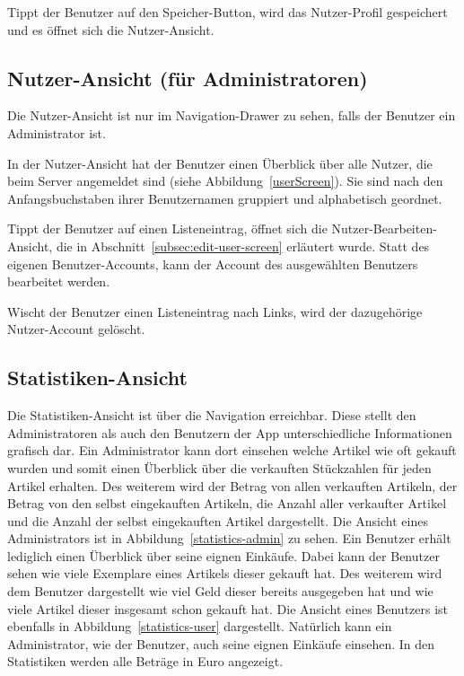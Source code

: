Tippt der Benutzer auf den Speicher-Button, wird das Nutzer-Profil gespeichert und es öffnet sich die Nutzer-Ansicht.

\subsection{Nutzer-Ansicht (für Administratoren)} \label{subsec:user-screen}

Die Nutzer-Ansicht ist nur im Navigation-Drawer zu sehen, falls der Benutzer ein Administrator ist.

In der Nutzer-Ansicht hat der Benutzer einen Überblick über alle Nutzer, die beim Server angemeldet sind (siehe Abbildung~\ref{userScreen}).
Sie sind nach den Anfangsbuchstaben ihrer Benutzernamen gruppiert und alphabetisch geordnet.

Tippt der Benutzer auf einen Listeneintrag, öffnet sich die Nutzer-Bearbeiten-Ansicht, die in Abschnitt~\ref{subsec:edit-user-screen} erläutert wurde.
Statt des eigenen Benutzer-Accounts, kann der Account des ausgewählten Benutzers bearbeitet werden.

Wischt der Benutzer einen Listeneintrag nach Links, wird der dazugehörige Nutzer-Account gelöscht.

\subsection{Statistiken-Ansicht} \label{subsec:statistics-screen}

Die Statistiken-Ansicht ist über die Navigation erreichbar.
Diese stellt den Administratoren als auch den Benutzern der App unterschiedliche Informationen grafisch dar.
Ein Administrator kann dort einsehen welche Artikel wie oft gekauft wurden und somit einen Überblick über die verkauften Stückzahlen für jeden Artikel erhalten.
Des weiterem wird der Betrag von allen verkauften Artikeln, der Betrag von den selbst eingekauften Artikeln, die Anzahl aller verkaufter Artikel und die Anzahl der selbst eingekauften Artikel dargestellt.
Die Ansicht eines Administrators ist in Abbildung~\ref{statistics-admin} zu sehen.
Ein Benutzer erhält lediglich einen Überblick über seine eignen Einkäufe.
Dabei kann der Benutzer sehen wie viele Exemplare eines Artikels dieser gekauft hat.
Des weiterem wird dem Benutzer dargestellt wie viel Geld dieser bereits ausgegeben hat und wie viele Artikel dieser insgesamt schon gekauft hat.
Die Ansicht eines Benutzers ist ebenfalls in Abbildung~\ref{statistics-user} dargestellt.
Natürlich kann ein Administrator, wie der Benutzer, auch seine eignen Einkäufe einsehen.
In den Statistiken werden alle Beträge in Euro angezeigt.

